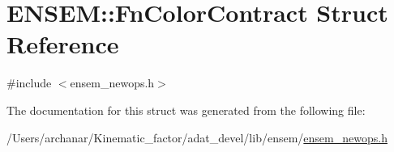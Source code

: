 \hypertarget{structENSEM_1_1FnColorContract}{}\section{E\+N\+S\+EM\+:\+:Fn\+Color\+Contract Struct Reference}
\label{structENSEM_1_1FnColorContract}


{\ttfamily \#include $<$ensem\+\_\+newops.\+h$>$}



The documentation for this struct was generated from the following file\+:\begin{DoxyCompactItemize}
\item 
/\+Users/archanar/\+Kinematic\+\_\+factor/adat\+\_\+devel/lib/ensem/\mbox{\hyperlink{lib_2ensem_2ensem__newops_8h}{ensem\+\_\+newops.\+h}}\end{DoxyCompactItemize}
